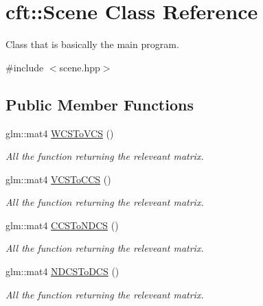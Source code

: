 \hypertarget{classcft_1_1Scene}{}\section{cft\+:\+:Scene Class Reference}
\label{classcft_1_1Scene}


Class that is basically the main program.  




{\ttfamily \#include $<$scene.\+hpp$>$}

\subsection*{Public Member Functions}
{\bf }\par
\begin{DoxyCompactItemize}
\item 
glm\+::mat4 \hyperlink{classcft_1_1Scene_aa171f31d1f6219ba6bc6792d9247ae7d}{W\+C\+S\+To\+V\+CS} ()\hypertarget{classcft_1_1Scene_aa171f31d1f6219ba6bc6792d9247ae7d}{}\label{classcft_1_1Scene_aa171f31d1f6219ba6bc6792d9247ae7d}

\begin{DoxyCompactList}\small\item\em All the function returning the releveant matrix. \end{DoxyCompactList}\item 
glm\+::mat4 \hyperlink{classcft_1_1Scene_a40921d50edb9b68766c8764446d12fe9}{V\+C\+S\+To\+C\+CS} ()\hypertarget{classcft_1_1Scene_a40921d50edb9b68766c8764446d12fe9}{}\label{classcft_1_1Scene_a40921d50edb9b68766c8764446d12fe9}

\begin{DoxyCompactList}\small\item\em All the function returning the releveant matrix. \end{DoxyCompactList}\item 
glm\+::mat4 \hyperlink{classcft_1_1Scene_a91f4d52de5e1999c87127d5f5bbe62e0}{C\+C\+S\+To\+N\+D\+CS} ()\hypertarget{classcft_1_1Scene_a91f4d52de5e1999c87127d5f5bbe62e0}{}\label{classcft_1_1Scene_a91f4d52de5e1999c87127d5f5bbe62e0}

\begin{DoxyCompactList}\small\item\em All the function returning the releveant matrix. \end{DoxyCompactList}\item 
glm\+::mat4 \hyperlink{classcft_1_1Scene_a13a19d6814ec51ce451618a682e99955}{N\+D\+C\+S\+To\+D\+CS} ()\hypertarget{classcft_1_1Scene_a13a19d6814ec51ce451618a682e99955}{}\label{classcft_1_1Scene_a13a19d6814ec51ce451618a682e99955}

\begin{DoxyCompactList}\small\item\em All the function returning the releveant matrix. \end{DoxyCompactList}\end{DoxyCompactItemize}

